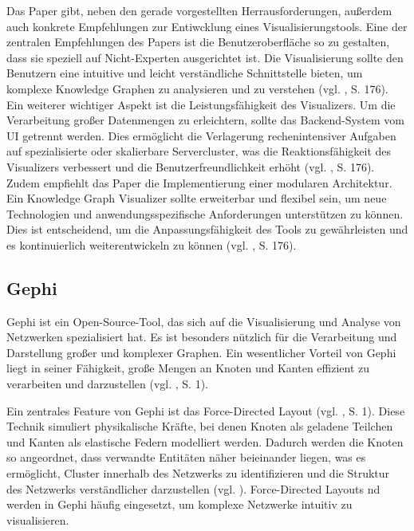 Das Paper gibt, neben den gerade vorgestellten Herrausforderungen, außerdem auch konkrete Empfehlungen zur Entiwcklung eines Visualisierungstools. Eine der zentralen Empfehlungen des Papers ist die Benutzeroberfläche so zu gestalten, dass sie speziell auf Nicht-Experten ausgerichtet ist. Die Visualisierung sollte den Benutzern eine intuitive und leicht verständliche Schnittstelle bieten, um komplexe Knowledge Graphen zu analysieren und zu verstehen (vgl. \cite{kgVisualization:Nararatwong}, S. 176). Ein weiterer wichtiger Aspekt ist die Leistungsfähigkeit des Visualizers. Um die Verarbeitung großer Datenmengen zu erleichtern, sollte das Backend-System vom UI getrennt werden. Dies ermöglicht die Verlagerung rechenintensiver Aufgaben auf spezialisierte oder skalierbare Servercluster, was die Reaktionsfähigkeit des Visualizers verbessert und die Benutzerfreundlichkeit erhöht (vgl. \cite{kgVisualization:Nararatwong}, S. 176). Zudem empfiehlt das Paper die Implementierung einer modularen Architektur. Ein Knowledge Graph Visualizer sollte erweiterbar und flexibel sein, um neue Technologien und anwendungsspezifische Anforderungen unterstützen zu können. Dies ist entscheidend, um die Anpassungsfähigkeit des Tools zu gewährleisten und es kontinuierlich weiterentwickeln zu können (vgl. \cite{kgVisualization:Nararatwong}, S. 176).

\subsection{Gephi}

Gephi ist ein Open-Source-Tool, das sich auf die Visualisierung und Analyse von Netzwerken spezialisiert hat. Es ist besonders nützlich für die Verarbeitung und Darstellung großer und komplexer Graphen. Ein wesentlicher Vorteil von Gephi liegt in seiner Fähigkeit, große Mengen an Knoten und Kanten effizient zu verarbeiten und darzustellen (vgl. \cite{gephi:Bastian}, S. 1).

Ein zentrales Feature von Gephi ist das Force-Directed Layout (vgl. \cite{gephi:Bastian}, S. 1). Diese Technik simuliert physikalische Kräfte, bei denen Knoten als geladene Teilchen und Kanten als elastische Federn modelliert werden. Dadurch werden die Knoten so angeordnet, dass verwandte Entitäten näher beieinander liegen, was es ermöglicht, Cluster innerhalb des Netzwerks zu identifizieren und die Struktur des Netzwerks verständlicher darzustellen (vgl. \cite{forceGraph:yWorks}). Force-Directed Layouts nd werden in Gephi häufig eingesetzt, um komplexe Netzwerke intuitiv zu visualisieren.

